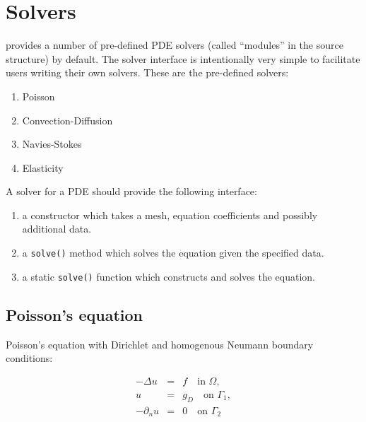 \chapter{Solvers}

\dolfin{} provides a number of pre-defined PDE solvers (called
``modules'' in the source structure) by default. The solver interface
is intentionally very simple to facilitate users writing their own
solvers. These are the pre-defined solvers:

\begin{enumerate}
\item
Poisson
\item
Convection-Diffusion
\item
Navies-Stokes
\item
Elasticity
\end{enumerate}

A solver for a PDE should provide the following interface:

\begin{enumerate}
\item
a constructor which takes a mesh, equation coefficients and possibly
additional data.
\item
a \texttt{solve()} method which solves the equation given the
specified data.
\item
a static \texttt{solve()} function which constructs and solves the
equation.
\end{enumerate}



\section{Poisson's equation}

Poisson's equation with Dirichlet and homogenous Neumann boundary
conditions:

\begin{equation} \label{eq:poisson}
  \begin{array}{rcl}
    - \Delta u &=& f \quad \mbox{in } \Omega, \\
    u &=& g_D \quad \mbox{on } \Gamma_1, \\
    - \partial_n u &=& 0 \quad \mbox{on } \Gamma_2
  \end{array}
\end{equation}

